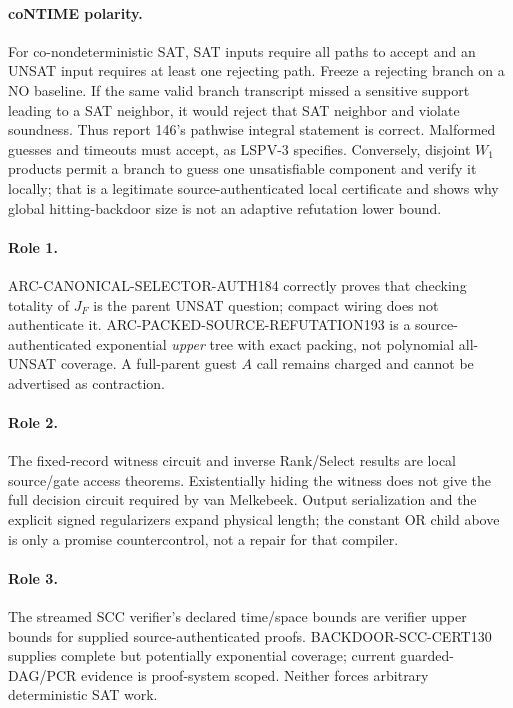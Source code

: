 \documentclass[11pt]{article}
\begin{document}
\paragraph{coNTIME polarity.}
For co-nondeterministic SAT, SAT inputs require all paths to accept and an UNSAT input requires at least one rejecting path.  Freeze a rejecting branch on a NO baseline.  If the same valid branch transcript missed a sensitive support leading to a SAT neighbor, it would reject that SAT neighbor and violate soundness.  Thus report 146's pathwise integral statement is correct.  Malformed guesses and timeouts must accept, as LSPV-3 specifies.  Conversely, disjoint $W_1$ products permit a branch to guess one unsatisfiable component and verify it locally; that is a legitimate source-authenticated local certificate and shows why global hitting-backdoor size is not an adaptive refutation lower bound.

\paragraph{Role 1.}
ARC-CANONICAL-SELECTOR-AUTH184 correctly proves that checking totality of $J_F$ is the parent UNSAT question; compact wiring does not authenticate it.  ARC-PACKED-SOURCE-REFUTATION193 is a source-authenticated exponential \emph{upper} tree with exact packing, not polynomial all-UNSAT coverage.  A full-parent guest $A$ call remains charged and cannot be advertised as contraction.

\paragraph{Role 2.}
The fixed-record witness circuit and inverse Rank/Select results are local source/gate access theorems.  Existentially hiding the witness does not give the full decision circuit required by van Melkebeek.  Output serialization and the explicit signed regularizers expand physical length; the constant OR child above is only a promise countercontrol, not a repair for that compiler.

\paragraph{Role 3.}
The streamed SCC verifier's declared time/space bounds are verifier upper bounds for supplied source-authenticated proofs.  BACKDOOR-SCC-CERT130 supplies complete but potentially exponential coverage; current guarded-DAG/PCR evidence is proof-system scoped.  Neither forces arbitrary deterministic SAT work.
\end{document}
